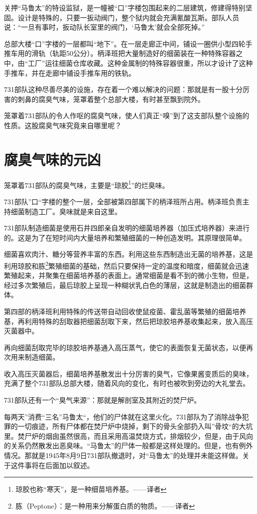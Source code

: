\documentclass[a4paper,12pt,UTF8,twoside]{ctexbook}
\begin{document}
关押“马鲁太”的特设监狱，是一幢被“口”字楼包围起来的二层建筑，修建得特别坚固。设计是特殊的，只要一扳动阀门，整个狱内就会充满氰酸瓦斯。部队人员说：“一旦有事时，扳动队长室里的阀门，‘马鲁太’就会全部死掉。”

总部大楼“口”字楼的一层都叫“地下”。在一层走廊正中间，铺设一圈供小型四轮手推车用的滑轨（轨距50公分）。柄泽班把大量制造好的细菌装在一种特殊容器之中，由“工厂”运往细菌仓库收藏。这种金属制的特殊容器很重，所以才设计了这种手推车，并在走廊中铺设手推车用的铁轨。

731部队这种尽善尽美的设施，存在着一个难以解决的问题：那就是有一股十分厉害的刺鼻的腐臭气味，笼罩着整个总部大楼，有时甚至飘到院外。

笼罩着731部队的令人作呕的腐臭气味，使人们真正“嗅”到了这支部队整个设施的性质。这股腐臭气味究竟来自哪里呢？

\section{腐臭气味的元凶}

笼罩着731部队的腐臭气味，主要是“琼胶\footnote{琼胶也称“寒天”，是一种细苗培养基。——译者}”的烂臭味。

731部队”口“字楼的整个一层，全部被第四部属下的柄泽班所占用。柄泽班负责主持细菌制造工厂。臭味就是来自这里。

731部队制造细菌是使用石井四郎亲自发明的细菌培养器（加压式培养器）来进行的。这是为了在短时间内大量培养和繁殖细菌的一种创造发明。其原理很简单。

细菌喜欢肉汁、糖分等营养丰富的东西。利用这些东西制造出无菌的培养基，这是利用琼胶和胨\footnote{胨（Peptone）：是一种用来分解蛋白质的物质。——译者}繁殖细菌的基础，然后只要保持一定的温度和暗度，细菌就会迅速繁殖起来，并聚集在细菌培养基的表面上。通常细菌是看不到的微小生物，但是，经过多次繁殖后，最后琼胶上呈现一种糊状乳白色的薄层，这就是制造出的细菌群体。

第四部的柄泽班利用特殊的传送带自动回收使鼠疫菌、霍乱菌等繁殖的细菌培养基，再利用特殊的刮取器把细菌刮取下来，然后把琼胶培养基收集起来，放入高压灭菌器中。

再向细菌刮取完毕的琼胶培养基通入高压蒸气，使它的表面恢复无菌状态，以便再次用来制造细菌。

收入高压灭菌器后，细菌培养基散发出十分厉害的臭气，它像果酱变质后的臭味，充满了整个731部队总部大楼，随着风向的变化，有时也被吹到旁边的大礼堂去。

731部队还有一个“臭气来源”：那就是解剖室及其附近的焚尸炉。

每两天”消费“三名”马鲁太“，他们的尸体就在这里火化。731部队为了消除战争犯罪的一切痕迹，所有尸体都在焚尸炉中烧掉，剩下的骨头全部扔入叫”骨坟“的大坑里。焚尸炉的烟囱虽然很高，而且采用高温焚烧方式，排烟较少，但是，由于风向的关系仍然散发出恶臭味。“马鲁太”的尸体一般都是这样处理的。但是，也有例外情况。那就是1945年8月9日731部队撤退时，对“马鲁太”的处理并未能这样做。关于这件事将在后面加以叙述。
\end{document}
